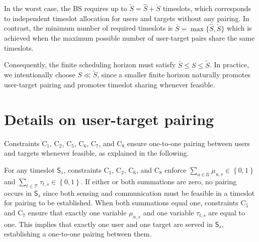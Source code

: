 \documentclass[10pt,journal,compsoc]{IEEEtran}
\theoremstyle{myremark}
\theoremstyle{myexample}
\begin{document}
\begin{appendices}
In the worst case, the \gls{BS} requires up to $ \widetilde{S} = \hat{S} + \check{S} $ timeslots, which corresponds to independent timeslot allocation for users and targets without any pairing. In contrast, the minimum number of required timeslots is $ \bar{S} = \max \big\{ \hat{S}, \check{S} \big\} $ which is achieved when the maximum possible number of user-target pairs share the same timeslots. 

Consequently, the finite scheduling horizon must satisfy $ \bar{S} \leq S \leq \widetilde{S} $. In practice, we intentionally choose $ S \ll \widetilde{S} $, since a smaller finite horizon naturally promotes user-target pairing and promotes timeslot sharing whenever feasible.




\setcounter{equation}{0}
\setcounter{table}{0}
\renewcommand{\theequation}{D.\arabic{equation}}
\section{Details on user-target pairing} \label{app:pairing-details}
 

Constraints $ \mathrm{C}_{1} $, $ \mathrm{C}_{2} $, $ \mathrm{C}_{5} $, $ \mathrm{C}_{6} $, $ \mathrm{C}_{7} $, and $ \mathrm{C}_{8} $ ensure one-to-one pairing between users and targets whenever feasible, as explained in the following. 


For any timeslot $ \mathsf{S}_s $, constraints $ \mathrm{C}_{1} $, $ \mathrm{C}_{2} $, $ \mathrm{C}_{6} $, and $ \mathrm{C}_{8} $ enforce $ \sum_{u \in \mathcal{U}} \mu_{u,s} \in \left\lbrace 0, 1 \right\rbrace $ and $ \sum_{t \in \mathcal{T}} \tau_{t,s} \in \left\lbrace 0, 1 \right\rbrace $. If either or both summations are zero, no pairing occurs in $ \mathsf{S}_s $ since both sensing and communication must be feasible in a timeslot for pairing to be established.  When both summations equal one, constraints $ \mathrm{C}_{5} $ and $ \mathrm{C}_{7} $ ensure that exactly one variable $ \mu_{u,s} $ and one variable $ \tau_{t,s} $ are equal to one. This implies that exactly one user and one target are served in $ \mathsf{S}_s $, establishing a one-to-one pairing between them.


\end{appendices}
\end{document}
